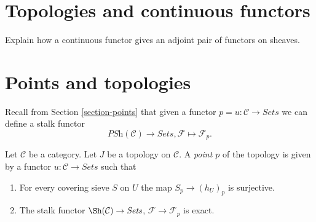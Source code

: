 \section{Topologies and continuous functors}
\label{section-topologies-continuous-functors}

\noindent
Explain how a continuous functor gives an adjoint
pair of functors on sheaves.





\section{Points and topologies}
\label{section-points-topologies}

\noindent
Recall from Section \ref{section-points} that given a functor
$p = u : \mathcal{C} \to \textit{Sets}$ we can define
a stalk functor
$$
\textit{PSh}(\mathcal{C}) \longrightarrow \textit{Sets},
\mathcal{F} \longmapsto \mathcal{F}_p.
$$

\begin{definition}
\label{definition-point-topology}
Let $\mathcal{C}$ be a category.
Let $J$ be a topology on $\mathcal{C}$.
A {\it point $p$} of the topology is given by a functor
$u : \mathcal{C} \to \textit{Sets}$ such that
\begin{enumerate}
\item For every covering sieve $S$ on $U$ the map
$S_p \to (h_U)_p$ is surjective.
\item The stalk functor $\Sh(\mathcal{C}) \to \textit{Sets}$,
$\mathcal{F} \to \mathcal{F}_p$ is exact.
\end{enumerate}
\end{definition}


















